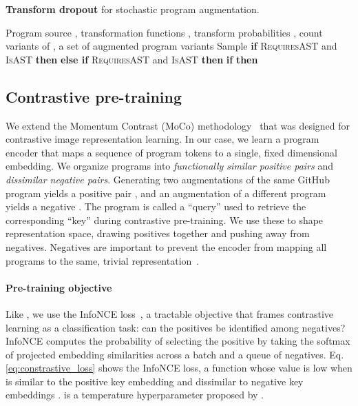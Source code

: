 \documentclass[11pt]{article}
\begin{document}
\begin{algorithm}[t]
\small
   \caption{\textbf{Transform dropout} for stochastic program augmentation.}
   \label{alg:transformation}
\begin{algorithmic}[1]
    Program source , transformation functions , transform probabilities , count 
     variants of 
   \STATE , a set of augmented program variants
        \STATE 
   		    \STATE Sample 
   		    \IF{}
       		    \STATE \textbf{if} \textsc{RequiresAST} and \textsc{IsAST} \textbf{then} 
       		    \STATE \textbf{else if} \textsc{RequiresAST} and \textsc{IsAST} \textbf{then} 
\STATE 
    	    \ENDIF{}
   		\ENDFOR{}
   		\STATE \textbf{if}  \textbf{then} 
   		\STATE 
   \ENDFOR{}
\end{algorithmic}
\end{algorithm} 

\subsection{Contrastive pre-training} \label{infonce_loss}
We extend the Momentum Contrast (MoCo) methodology~\citep{he2019momentum} that was designed for contrastive image representation learning. In our case, we learn a program encoder  that maps a sequence of program tokens to a single, fixed dimensional embedding.
We organize programs into \textit{functionally similar positive pairs} and \textit{dissimilar negative pairs}.
Generating two augmentations of the same GitHub program yields a positive pair , and an augmentation of a different program yields a negative . The program  is called a ``query'' used to retrieve the corresponding ``key''  during contrastive pre-training.
We use these to shape representation space, drawing positives together and pushing away from negatives. Negatives are important to prevent the encoder  from mapping all programs to the same, trivial representation~\cite{pmlr-v97-saunshi19a}.


\paragraph{Pre-training objective}
Like \citet{he2019momentum}, we use the InfoNCE loss~\citep{cpcv1_oord2018representation}, a tractable objective that frames contrastive learning as a classification task: can the positives be identified among negatives? InfoNCE computes the probability of selecting the positive by taking the softmax of projected embedding similarities across a batch and a queue of negatives.
Eq. \eqref{eq:constrastive_loss} shows the InfoNCE loss, a function whose value is low when  is similar to the positive key embedding  and dissimilar to negative key embeddings .  is a temperature hyperparameter proposed by \citet{wu2018unsupervised}.
\end{document}
